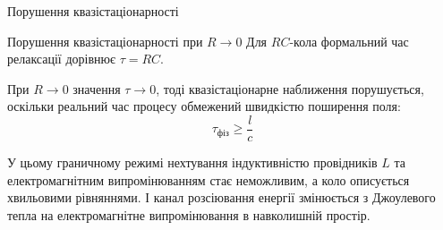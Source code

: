 \documentclass[onlytextwidth]{beamer}
\begin{document}
\begin{frame}{Порушення квазістаціонарності}{}
	\begin{block}{Порушення квазістаціонарності при $R \to 0$}\justifying
    Для $RC$-кола формальний час релаксації дорівнює $\tau = RC$.
    
    При $R \to 0$ значення $\tau \to 0$, тоді квазістаціонарне наближення порушується, оскільки реальний час процесу обмежений швидкістю поширення поля:
    $$\tau_{\text{фіз}} \ge \frac{l}{c}$$
    
    У цьому граничному режимі нехтування індуктивністю провідників $L$ та електромагнітним випромінюванням стає неможливим, а коло описується хвильовими рівняннями. І канал розсіювання енергії змінюється з Джоулевого тепла на електромагнітне випромінювання в навколишній простір.
\end{block}
\end{frame}
\end{document}
